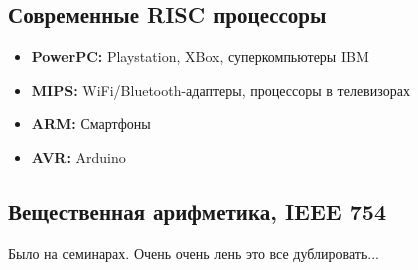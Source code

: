 \subsection{Современные RISC процессоры}

\begin{itemize}
	\item \textbf{PowerPC:} Playstation, XBox, суперкомпьютеры IBM
	\item \textbf{MIPS:} WiFi/Bluetooth-адаптеры, процессоры в телевизорах
	\item \textbf{ARM:} Смартфоны
	\item \textbf{AVR:} Arduino
\end{itemize}

\subsection{Вещественная арифметика, IEEE 754}

Было на семинарах. Очень очень лень это все дублировать...



